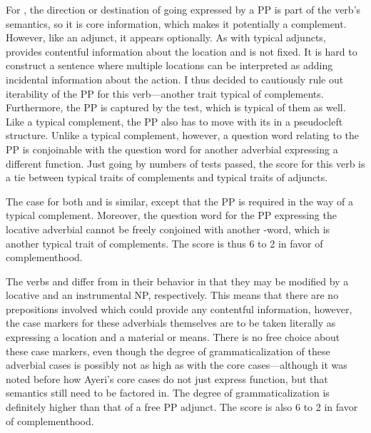 For , the direction or destination of going expressed by a
PP is part of the verb's semantics, so it is core information, which makes it
potentially a complement. However, like an adjunct, it appears optionally. As
with typical adjuncts,  provides contentful information about the
location and is not fixed. It is hard to construct a sentence where multiple
locations can be interpreted as adding incidental information about the action.
I thus decided to cautiously rule out iterability of the PP for this
verb---another trait typical of complements. Furthermore, the PP is captured by
the  test, which is typical of them as well. Like a typical
complement, the PP also has to move with its  in a pseudocleft
structure. Unlike a typical complement, however, a question word relating to the
PP is conjoinable with the question word for another adverbial expressing a
different function. Just going by numbers of tests passed, the score for this
verb is a tie between typical traits of complements and typical traits of
adjuncts.

The case for both  and  is
similar, except that the PP is required in the way of a typical complement.
Moreover, the question word for the PP expressing the locative adverbial cannot
be freely conjoined with another -word, which is another typical trait
of complements. The score is thus 6 to 2 in favor of complementhood.

The verbs  and  differ from
 in their behavior in that they may be modified by a
locative and an instrumental NP, respectively. This means that there are no
prepositions involved which could provide any contentful information, however,
the case markers for these adverbials themselves are to be taken literally as
expressing a location and a material or means. There is no free choice about
these case markers, even though the degree of grammaticalization of these
adverbial cases is possibly not as high as with the core cases---although it
was noted before how Ayeri's core cases do not just express function, but that
semantics still need to be factored in. The degree of grammaticalization is
definitely higher than that of a free PP adjunct. The score is also 6 to 2 in
favor of complementhood.

